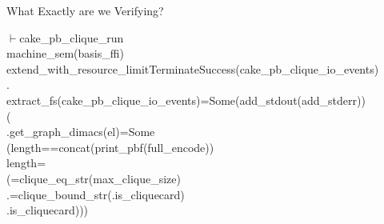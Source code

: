 \documentclass[aspectratio=169,compress,10pt]{beamer}
\renewcommand{\HOLTokenTurnstile}{\ensuremath{\vdash\!\!}}
\renewcommand{\HOLConst}[1]{\textsf{\small #1}}
\renewcommand{\HOLSymConst}[1]{\HOLConst{#1}}
\renewcommand{\HOLStringLitDG}[1]{\scalebox{0.9}{\texttt{"#1"}}}
\begin{document}
\begin{frame}{What Exactly are we Verifying?}
{\begin{holthmenv}
\HOLTokenTurnstile{}\;\HOLConst{cake_pb_clique_run}\;\;\;\;\;\HOLSymConst{\HOLTokenImp{}}\\
\;\;\;\;\;\HOLConst{machine_sem}\;\;(\HOLConst{basis_ffi}\;\;)\;\;\HOLSymConst{\HOLTokenSubset{}}\\
\;\;\;\;\;\;\;\HOLConst{extend_with_resource_limit}\;\HOLTokenLeftbrace{}\HOLConst{Terminate}\;\HOLConst{Success}\;(\HOLConst{cake_pb_clique_io_events}\;\;)\HOLTokenRightbrace{}\;\HOLSymConst{\HOLTokenConj{}}\\
\;\;\;\;\;\HOLSymConst{\HOLTokenExists{}}\;.\\
\;\;\;\;\;\;\;\HOLConst{extract_fs}\;\;(\HOLConst{cake_pb_clique_io_events}\;\;)\;\HOLSymConst{=}\;\HOLConst{Some}\;(\HOLConst{add_stdout}\;(\HOLConst{add_stderr}\;\;)\;)\;\HOLSymConst{\HOLTokenConj{}}\\
\;\;\;\;\;\;\;(\;\HOLSymConst{\HOLTokenNotEqual{}}\;\HOLStringLitDG{}\;\HOLSymConst{\HOLTokenImp{}}\\
\;\;\;\;\;\;\;\;\;\;\HOLSymConst{\HOLTokenExists{}}.\;\HOLConst{get_graph_dimacs}\;\;(\HOLConst{el}\;\;)\;\HOLSymConst{=}\;\HOLConst{Some}\;\;\HOLSymConst{\HOLTokenConj{}}\\
\;\;\;\;\;\;\;\;\;\;\;\;\;\;(\HOLConst{length}\;\;\HOLSymConst{=}\;\;\HOLSymConst{\HOLTokenConj{}}\;\;\HOLSymConst{=}\;\HOLConst{concat}\;(\HOLConst{print_pbf}\;(\HOLConst{full_encode}\;))\;\HOLSymConst{\HOLTokenDisj{}}\\
\;\;\;\;\;\;\;\;\;\;\;\;\;\;\;\HOLConst{length}\;\;\HOLSymConst{=}\;\;\HOLSymConst{\HOLTokenConj{}}\\
\;\;\;\;\;\;\;\;\;\;\;\;\;\;\;\;\;\;\;(\;\HOLSymConst{=}\;\HOLConst{clique_eq_str}\;(\HOLConst{max_clique_size}\;)\;\HOLSymConst{\HOLTokenDisj{}}\\
\;\;\;\;\;\;\;\;\;\;\;\;\;\;\;\;\;\;\;\HOLSymConst{\HOLTokenExists{}}\;.\;\HOLSymConst{=}\;\HOLConst{clique_bound_str}\;\;\;\HOLSymConst{\HOLTokenConj{}}\;(\HOLSymConst{\HOLTokenForall{}}.\;\HOLConst{is_clique}\;\;\;\HOLSymConst{\HOLTokenImp{}}\;\HOLConst{card}\;\;\HOLSymConst{\HOLTokenLeq{}}\;)\;\HOLSymConst{\HOLTokenConj{}}\\
\;\;\;\;\;\;\;\;\;\;\;\;\;\;\;\;\;\;\;\;\;\;\;\;\;\;\HOLSymConst{\HOLTokenExists{}}.\;\HOLConst{is_clique}\;\;\;\HOLSymConst{\HOLTokenConj{}}\;\;\HOLSymConst{\HOLTokenLeq{}}\;\HOLConst{card}\;)))
\end{holthmenv}}
\end{frame}
\end{document}
